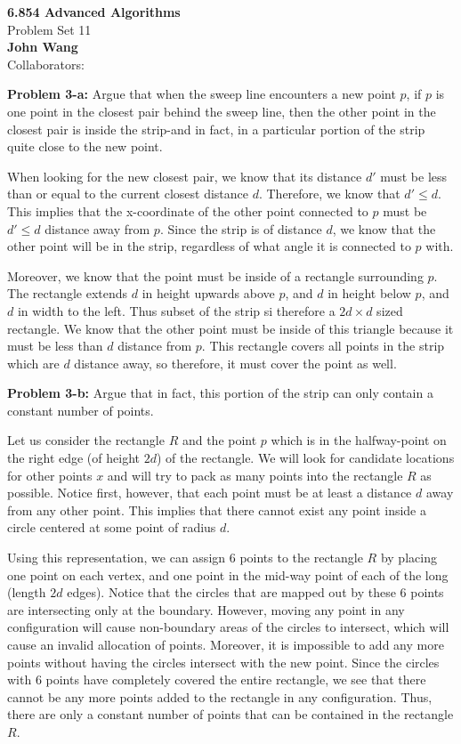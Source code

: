 \documentclass[psamsfonts]{amsart}
\newenvironment{sol}{\vspace{0.25cm}{\large \bfseries Solution:}}{\qedsymbol}
\newenvironment{prob}[1]{\begin{framed}{\large \bfseries Problem #1:}}{\end{framed}}
\newcommand{\makenewtitle}{
    \begin{center}
    {\huge \bfseries 6.854 Advanced Algorithms} \\
    Problem Set 11\\
    \vspace{0.25cm}
    {\bfseries John Wang} \\
    Collaborators:  
    \end{center}
    \vspace{0.5cm}
}
\begin{document}
\newpage
\makenewtitle

\begin{prob}{3-a}
Argue that when the sweep line encounters a new point $p$, if $p$ is one point in the closest pair behind the sweep line, then the other point in the closest pair is inside the strip-and in fact, in a particular portion of the strip quite close to the new point.
\end{prob}
\begin{sol}
When looking for the new closest pair, we know that its distance $d'$ must be less than or equal to the current closest distance $d$. Therefore, we know that $d' \leq d$. This implies that the x-coordinate of the other point connected to $p$ must be $d' \leq d$ distance away from $p$. Since the strip is of distance $d$, we know that the other point will be in the strip, regardless of what angle it is connected to $p$ with. 

Moreover, we know that the point must be inside of a rectangle surrounding $p$. The rectangle extends $d$ in height upwards above $p$, and $d$ in height below $p$, and $d$ in width to the left. Thus subset of the strip si therefore a $2d \times d$ sized rectangle. We know that the other point must be inside of this triangle because it must be less than $d$ distance from $p$. This rectangle covers all points in the strip which are $d$ distance away, so therefore, it must cover the point as well.
\end{sol}

\begin{prob}{3-b}
Argue that in fact, this portion of the strip can only contain a constant number of points.
\end{prob}
\begin{sol}
Let us consider the rectangle $R$ and the point $p$ which is in the halfway-point on the right edge (of height $2d$) of the rectangle. We will look for candidate locations for other points $x$ and will try to pack as many points into the rectangle $R$ as possible. Notice first, however, that each point must be at least a distance $d$ away from any other point. This implies that there cannot exist any point inside a circle centered at some point of radius $d$. 

Using this representation, we can assign 6 points to the rectangle $R$ by placing one point on each vertex, and one point in the mid-way point of each of the long (length $2d$ edges). Notice that the circles that are mapped out by these 6 points are intersecting only at the boundary. However, moving any point in any configuration will cause non-boundary areas of the circles to intersect, which will cause an invalid allocation of points. Moreover, it is impossible to add any more points without having the circles intersect with the new point. Since the circles with 6 points have completely covered the entire rectangle, we see that there cannot be any more points added to the rectangle in any configuration. Thus, there are only a constant number of points that can be contained in the rectangle $R$.
\end{sol}
\end{document}
